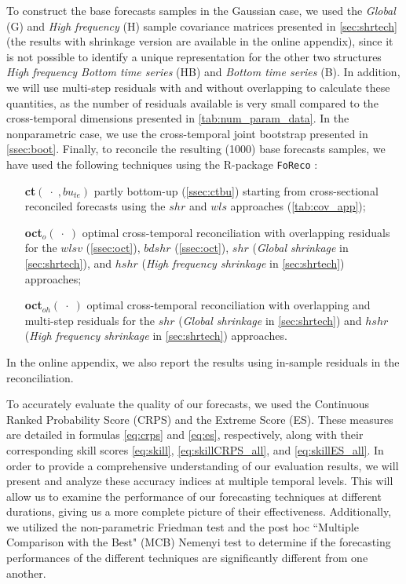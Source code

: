 \documentclass[a4paper,11pt]{article}
\theoremstyle{definition}
\begin{document}
To construct the base forecasts samples in the Gaussian case, we used the \textit{Global} (G) and \textit{High frequency} (H) sample covariance matrices presented in \autoref{sec:shrtech} (the results with shrinkage version are available in the online appendix), since it is not possible to identify a unique representation \citep{giro2022} for the other two structures \textit{High frequency Bottom time series} (HB) and \textit{Bottom time series} (B). In addition, we will use multi-step residuals with and without overlapping to calculate these quantities, as the number of residuals available is very small compared to the cross-temporal dimensions presented in \autoref{tab:num_param_data}. In the nonparametric case, we use the cross-temporal joint bootstrap presented in \autoref{ssec:boot}.
Finally, to reconcile the resulting (1000) base forecasts samples, we have used the following techniques using the \textsf{R}-package \texttt{FoReco} \citep{girolimetto2022}:
\begin{itemize}[nosep, leftmargin = 2.5cm]
	\item[\textbf{ct}$(\;\cdot\;, bu_{te})$] partly bottom-up (\autoref{ssec:ctbu}) starting from cross-sectional reconciled forecasts using the $shr$ and $wls$ approaches (\autoref{tab:cov_app});
	\item[\textbf{oct}$_o(\;\cdot\;)$] optimal cross-temporal reconciliation with overlapping residuals for the $wlsv$ (\autoref{ssec:oct}), $bdshr$ (\autoref{ssec:oct}), $shr$ (\textit{Global shrinkage} in \autoref{sec:shrtech}), and $hshr$ (\textit{High frequency shrinkage} in \autoref{sec:shrtech}) approaches;
	\item[\textbf{oct}$_{oh}(\;\cdot\;)$] optimal cross-temporal reconciliation with overlapping and multi-step residuals for the $shr$ (\textit{Global shrinkage} in \autoref{sec:shrtech}) and $hshr$ (\textit{High frequency shrinkage} in \autoref{sec:shrtech}) approaches.
\end{itemize}
In the online appendix, we also report the results using in-sample residuals in the reconciliation.

To accurately evaluate the quality of our forecasts, we used the Continuous Ranked Probability Score (CRPS) and the Extreme Score (ES). These measures are detailed in formulas \eqref{eq:crps} and \eqref{eq:es}, respectively, along with their corresponding skill scores \eqref{eq:skill}, \eqref{eq:skillCRPS_all}, and \eqref{eq:skillES_all}.
In order to provide a comprehensive understanding of our evaluation results, we will present and analyze these accuracy indices at multiple temporal levels. This will allow us to examine the performance of our forecasting techniques at different durations, giving us a more complete picture of their effectiveness.
Additionally, we utilized the non-parametric Friedman test and the post hoc “Multiple Comparison with the Best" (MCB) Nemenyi test \citep{koning2005, kourentzes2019, makridakis2022} to determine if the forecasting performances of the different techniques are significantly different from one another.
\end{document}
